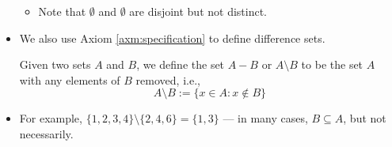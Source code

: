 \documentclass[../main.tex]{subfiles}
\begin{document}
\begin{itemize}
    \begin{itemize}
        \item Note that $\emptyset$ and $\emptyset$ are disjoint but not distinct.
    \end{itemize}
    \item We also use Axiom \ref{axm:specification} to define difference sets.
    \begin{dfn}
        Given two sets $A$ and $B$, we define the set $A-B$ or $A\setminus B$ to be the set $A$ with any elements of $B$ removed, i.e.,
        \begin{equation*}
            A\setminus B := \{x\in A:x\notin B\}
        \end{equation*}
    \end{dfn}
    \item For example, $\{1,2,3,4\}\setminus\{2,4,6\}=\{1,3\}$ --- in many cases, $B\subseteq A$, but not necessarily.
\end{itemize}
\end{document}
